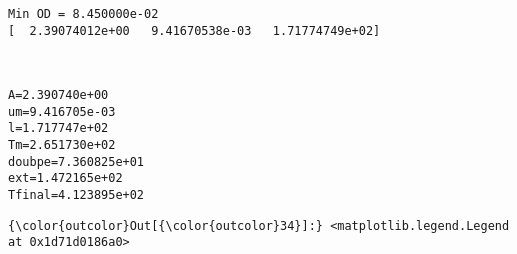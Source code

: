 \documentclass[11pt]{article}
\begin{document}
    \begin{Verbatim}[commandchars=\\\{\}]
Min OD = 8.450000e-02
[  2.39074012e+00   9.41670538e-03   1.71774749e+02]

    \end{Verbatim}

    \begin{center}
    \end{center}
    { \hspace*{\fill} \\}
    
    \begin{Verbatim}[commandchars=\\\{\}]
A=2.390740e+00
um=9.416705e-03
l=1.717747e+02
Tm=2.651730e+02
doubpe=7.360825e+01
ext=1.472165e+02
Tfinal=4.123895e+02

    \end{Verbatim}

            \begin{Verbatim}[commandchars=\\\{\}]
{\color{outcolor}Out[{\color{outcolor}34}]:} <matplotlib.legend.Legend at 0x1d71d0186a0>
\end{Verbatim}
        
    \begin{center}
    \end{center}
    { \hspace*{\fill} \\}
    
    \begin{center}
    \end{center}
    { \hspace*{\fill} \\}
    
\end{document}
